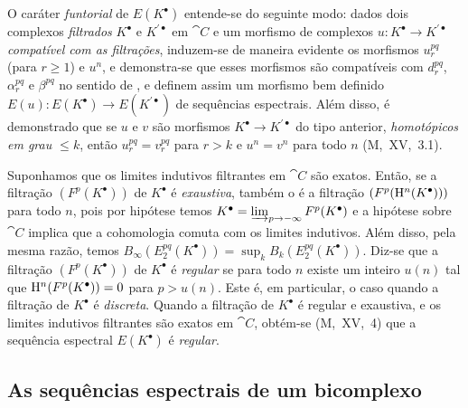 \begin{env}[11.2.3]
\label{0.11.2.3}
O caráter \emph{funtorial} de $E(K^\bullet)$ entende-se do seguinte modo: dados dois complexos \emph{filtrados} $K^\bullet$ e $K^{\prime\bullet}$ em $\cat{C}$ e um morfismo de complexos $u:K^\bullet\to K^{\prime\bullet}$ \emph{compatível com as filtrações}, induzem-se de maneira evidente os morfismos $u_r^{pq}$ (para $r\geq 1$) e $u^n$, e demonstra-se que esses morfismos são compatíveis com $d_r^{pq}$, $\alpha_r^{pq}$ e $\beta^{pq}$ no sentido de , e definem assim um morfismo bem definido $E(u):E(K^\bullet)\to E(K^{\prime\bullet})$ de sequências espectrais.
Além disso, é demonstrado que se $u$ e $v$ são morfismos $K^\bullet\to K^{\prime\bullet}$ do tipo anterior, \emph{homotópicos em grau $\leq k$}, então $u_r^{pq}=v_r^{pq}$ para $r>k$ e $u^n=v^n$ para todo $n$ (M,~XV,~3.1).
\end{env}

\begin{env}[11.2.4]
\label{0.11.2.4}
Suponhamos que os limites indutivos filtrantes em $\cat{C}$ são exatos.
Então, se a filtração $(F^p(K^\bullet))$ de $K^\bullet$ é \emph{exaustiva}, também o é a filtração $(F^p(\mathrm{H}^n(K^\bullet)))$ para todo $n$, pois por hipótese temos $K^\bullet=\varinjlim_{p\to-\infty}F^p(K^\bullet)$ e a hipótese sobre $\cat{C}$ implica que a cohomologia comuta com os limites indutivos.
Além disso, pela mesma razão, temos $B_\infty(E_2^{pq}(K^\bullet))=\sup_k B_k(E_2^{pq}(K^\bullet))$.
Diz-se que a filtração $(F^p(K^\bullet))$ de $K^\bullet$ é \emph{regular} se para todo $n$ existe um inteiro $u(n)$ tal que $\mathrm{H}^n(F^p(K^\bullet))=0$ para $p>u(n)$.
Este é, em particular, o caso quando a filtração de $K^\bullet$ é \emph{discreta}.
Quando a filtração de $K^\bullet$ é regular e exaustiva, e os limites indutivos filtrantes são exatos em $\cat{C}$, obtém-se (M,~XV,~4) que a sequência espectral $E(K^\bullet)$ é \emph{regular}.
\end{env}

\subsection{As sequências espectrais de um bicomplexo}
\label{subsection:0.11.3}

